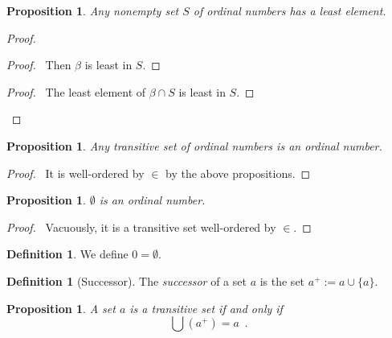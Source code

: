 \documentclass{book}
\let\qed\relax
\newtheorem{prop}[ax]{Proposition}
\theoremstyle{definition}
\newtheorem{df}[ax]{Definition}
\begin{document}
\begin{prop}
Any nonempty set $S$ of ordinal numbers has a least element.
\end{prop}

\begin{proof}
\pf
{}
\begin{proof}
	\pf\ Then $\beta$ is least in $S$.
\end{proof}
\begin{proof}
	\pf\ The least element of $\beta \cap S$ is least in $S$.
\end{proof}
\qed
\end{proof}

\begin{prop}
Any transitive set of ordinal numbers is an ordinal number.
\end{prop}

\begin{proof}
\pf\ It is well-ordered by $\in$ by the above propositions. \qed
\end{proof}

\begin{prop}
$\emptyset$ is an ordinal number.
\end{prop}

\begin{proof}
\pf\ Vacuously, it is a transitive set well-ordered by $\in$.
\end{proof}

\begin{df}
We define $0 = \emptyset$.
\end{df}

\begin{df}[Successor]
The \emph{successor} of a set $a$ is the set $a^+ := a \cup \{a\}$.
\end{df}

\begin{prop}
\label{prop:Uaplus}
A set $a$ is a transitive set if and only if
\[ \bigcup (a^+) = a \enspace . \]
\end{prop}
\end{document}
